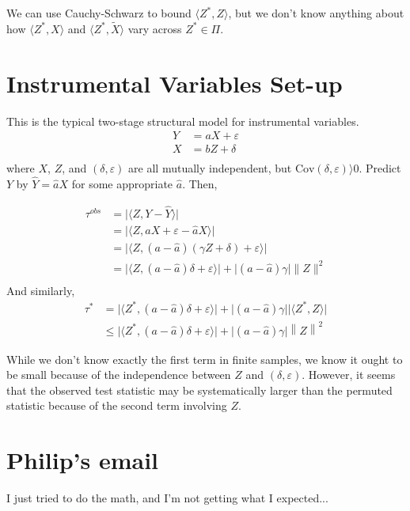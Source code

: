 \documentclass[12pt]{article}
\newcommand{\cov}{\textrm{Cov}}
\newcommand{\eps}{\varepsilon}
\begin{document}
We can use Cauchy-Schwarz to bound $\langle Z^*, Z \rangle$, but we don't know anything about how $\langle Z^*, X \rangle$ and $\langle Z^*, \tilde{X} \rangle$ vary across $Z^* \in \Pi$.

\section{Instrumental Variables Set-up}
This is the typical two-stage structural model for instrumental variables.
\begin{align*}
Y &= aX + \eps \\
X &= bZ + \delta \\
\end{align*}
where $X$, $Z$, and $(\delta, \eps)$ are all mutually independent, but $\cov(\delta, \eps) \rangle  0$.
Predict $Y$ by $\hat{Y} = \hat{a}X$ for some appropriate $\hat{a}$.
Then,

\begin{align*}
\tau^{obs} &=\lvert \langle Z, Y - \hat{Y} \rangle \rvert\\
&=\lvert \langle Z, aX + \eps - \hat{a}X  \rangle \rvert\\
&= \lvert \langle Z, (a-\hat{a})(\gamma Z + \delta) + \eps \rangle \rvert \\
&= \lvert \langle Z, (a-\hat{a})\delta + \eps \rangle \rvert + \lvert (a-\hat{a})\gamma\rvert \lVert Z\rVert^2  \\
\end{align*}
And similarly,
\begin{align*}
\tau^{*} &= \lvert \langle Z^*, (a-\hat{a})\delta + \eps \rangle \rvert + \lvert (a-\hat{a})\gamma\rvert \lvert \langle Z^*, Z \rangle \rvert  \\
&\leq \lvert \langle Z^*, (a-\hat{a})\delta + \eps \rangle \rvert + \lvert (a-\hat{a})\gamma\rvert \left\lVert Z \right\rVert^2
\end{align*}

While we don't know exactly the first term in finite samples, we know it ought to be small because of the independence between $Z$ and $(\delta, \eps)$.
However, it seems that the observed test statistic may be systematically larger than the permuted statistic because of the second term involving $Z$.


\section{Philip's email}
I just tried to do the math, and I'm not getting what I expected...
\end{document}
